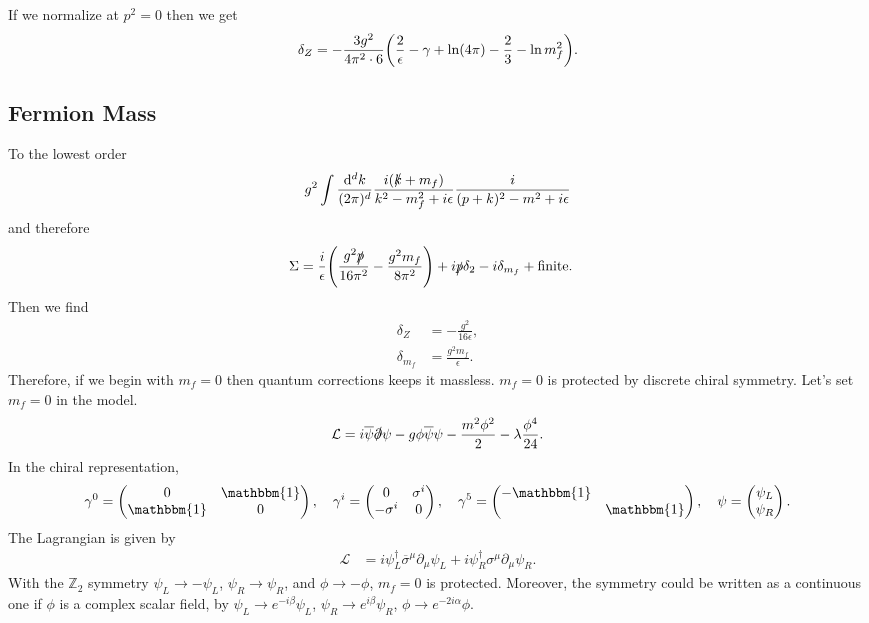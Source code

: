 \documentclass{article}
\begin{document}
If we normalize at $p^2 = 0$ then we get
\[ \delta_Z = -\frac{3g^2}{4\pi^2\cdot 6} \qty(\frac{2}{\epsilon} - \gamma + \ln(4\pi) - \frac{2}{3} - \ln m_f^2). \]

\subsection{Fermion Mass}

To the lowest order
\begin{align*}
    g^2 \int \frac{\dd[d]{k}}{(2\pi)^d} \frac{i(\slashed{k} + m_f)}{k^2 - m_f^2 + i\epsilon} \frac{i}{(p+k)^2 - m^2 + i\epsilon}
\end{align*}
and therefore
\begin{align*}
    \Sigma &= \frac{i}{\epsilon} \qty(\frac{g^2 \slashed{p}}{16\pi^2} - \frac{g^2 m_f}{8\pi^2}) + i\slashed{p} \delta_2 - i\delta_{m_f} + \text{finite}.
\end{align*}
Then we find
\begin{align*}
    \delta_Z &= -\frac{g^2}{16\epsilon}, \\
    \delta_{m_f} &= \frac{g^2 m_f}{\epsilon}.
\end{align*}
Therefore, if we begin with $m_f=0$ then quantum corrections keeps it massless.
$m_f = 0$ is protected by discrete chiral symmetry.
Let's set $m_f = 0$ in the model.
\[ \mathcal{L} = i\overline{\psi}\slashed{\partial} \psi - g\phi\overline{\psi}\psi - \frac{m^2 \phi^2}{2} - \lambda \frac{\phi^4}{24}. \]
In the chiral representation,
\[ \gamma^0 = \begin{pmatrix}
    0 & \mathbbm{1} \\
    \mathbbm{1} & 0
\end{pmatrix},\quad \gamma^i = \begin{pmatrix}
    0 & \sigma^i \\
    -\sigma^i & 0
\end{pmatrix},\quad \gamma^5 = \begin{pmatrix}
    -\mathbbm{1} & \\ & \mathbbm{1}
\end{pmatrix},\quad \psi = \begin{pmatrix}
    \psi_L \\ \psi_R
\end{pmatrix}. \]
The Lagrangian is given by
\begin{align*}
    \mathcal{L} &= i\psi^\dagger_L \overline{\sigma}^\mu \partial_\mu \psi_L + i \psi^\dagger_R \sigma^\mu \partial_\mu \psi_R.
\end{align*}
With the $\mathbb{Z}_2$ symmetry $\psi_L \rightarrow -\psi_L$, $\psi_R \rightarrow \psi_R$, and $\phi \rightarrow -\phi$, $m_f = 0$ is protected.
Moreover, the symmetry could be written as a continuous one if $\phi$ is a complex scalar field, by $\psi_L \rightarrow e^{-i\beta}\psi_L$, $\psi_R \rightarrow e^{i\beta} \psi_R$, $\phi \rightarrow e^{-2i\alpha}\phi$.
\end{document}
